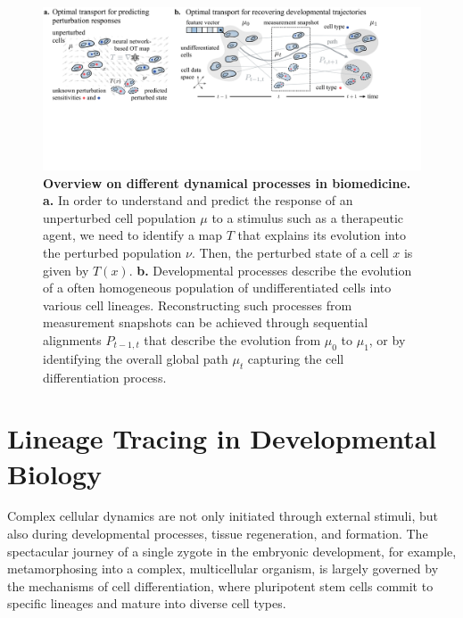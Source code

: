 \begin{figure}[t]
  \includegraphics[width=\textwidth]{figures/fig_bio_problems.pdf}
  \caption{\textbf{Overview on different dynamical processes in biomedicine.} \textbf{a.} In order to understand and predict the response of an unperturbed cell population $\mu$ to a stimulus such as a therapeutic agent, we need to identify a map $T$ that explains its evolution into the perturbed population $\nu$. Then, the perturbed state of a cell $x$ is given by $T(x)$.  \textbf{b.} Developmental processes describe the evolution of a often homogeneous population of undifferentiated cells into various cell lineages. Reconstructing such processes from measurement snapshots can be achieved through sequential alignments $P_{t-1,t}$ that describe the evolution from $\mu_0$ to $\mu_1$, or by identifying the overall global path $\mu_t$ capturing the cell differentiation process.}
  \label{fig:bio_problems}
\end{figure}

\section{Lineage Tracing in Developmental Biology}
\label{sec:cell_differentiation}

Complex cellular dynamics are not only initiated through external stimuli, but also during developmental processes, tissue regeneration, and formation.
The spectacular journey of a single zygote in the embryonic development, for example, metamorphosing into a complex, multicellular organism, is largely governed by the mechanisms of cell differentiation, where pluripotent stem cells commit to specific lineages and mature into diverse cell types.


